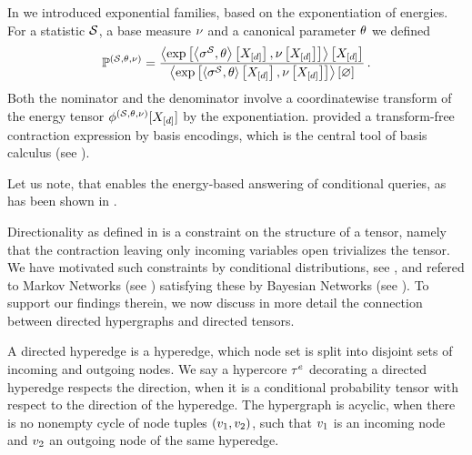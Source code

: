 \begin{example}
    In  we introduced exponential families, based on the exponentiation of energies.
    For a statistic $\mathcal{S}$, a base measure $\nu$ and a canonical parameter $\theta$ we defined
    \begin{align*}
        \mathbb{P}^{(\mathcal{S},\theta,\nu)} = \frac{
            \left\langle \mathrm{exp}\left[\left\langle \sigma^{\mathcal{S}},\theta\right\rangle \left[ X_{[d]} \right],\nu\left[X_{[d]}\right]\right]\right\rangle \left[ X_{[d]} \right]
        }{
            \left\langle \mathrm{exp}\left[\left\langle \sigma^{\mathcal{S}},\theta\right\rangle \left[ X_{[d]} \right],\nu\left[X_{[d]}\right]\right]\right\rangle \left[ \varnothing \right]
        } \, .
    \end{align*}
    Both the nominator and the denominator involve a coordinatewise transform of the energy tensor $\phi^{(\mathcal{S},\theta,\nu)}[X_{[d]}]$ by the exponentiation.
     provided a transform-free contraction expression by basis encodings, which is the central tool of basis calculus (see ).

    Let us note, that  enables the energy-based answering of conditional queries, as has been shown in .
\end{example}





Directionality as defined in  is a constraint on the structure of a tensor, namely that the contraction leaving only incoming variables open trivializes the tensor.
We have motivated such constraints by conditional distributions, see , and refered to Markov Networks (see ) satisfying these by Bayesian Networks (see ).
To support our findings therein, we now discuss in more detail the connection between directed hypergraphs and directed tensors.

\begin{definition}
    A directed hyperedge is a hyperedge, which node set is split into disjoint sets of incoming and outgoing nodes.
    We say a hypercore $\tau^{e}$ decorating a directed hyperedge respects the direction, when it is a conditional probability tensor with respect to the direction of the hyperedge.
    The hypergraph is acyclic, when there is no nonempty cycle of node tuples $(v_1,v_2)$, such that $v_1$ is an incoming node and $v_2$ an outgoing node of the same hyperedge.
\end{definition}

